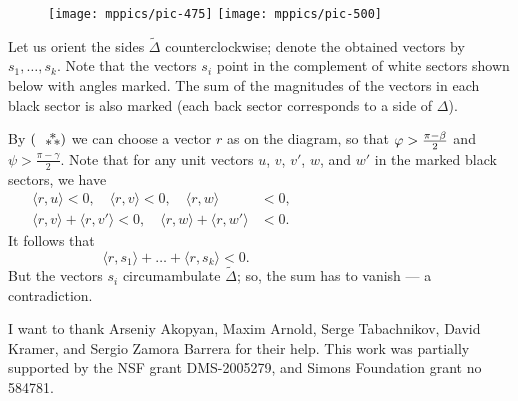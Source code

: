 \documentclass[oneside,a4paper]{amsart}
\begin{document}
\begin{figure}
\vskip-2mm
\centering
\texttt{[image: mppics/pic-475]}
\bigskip
\texttt{[image: mppics/pic-500]}
\vskip1mm
\end{figure}

Let us orient the sides $\tilde\Delta$ counterclockwise;
denote the obtained vectors by $s_1,\dots,s_k$.
Note that the vectors $s_i$ point in the complement of white sectors shown below with angles marked.
The sum of the magnitudes of the vectors in each black sector is also marked (each back sector corresponds to a side of $\Delta$).

By $(\asterism)$ we can choose a vector $r$ as on the diagram, so that $\phi\z>\tfrac{\pi-\beta}2$ and $\psi>\tfrac{\pi-\gamma}2$.
Note that for any unit vectors $u$, $v$, $v'$, $w$, and $w'$ in the marked black sectors,
we have
\[\begin{aligned}
\langle r,u\rangle<0,\quad \langle r,v\rangle<0,\quad \langle r,w\rangle&<0,
\\
\langle r,v\rangle+\langle r,v'\rangle<0,\quad \langle r,w\rangle+\langle r,w'\rangle&<0.
 \end{aligned}
\qquad\qquad\qquad\qquad\qquad\qquad\qquad\]
It follows that 
\[
\langle r,s_1\rangle+\dots+\langle r,s_k\rangle<0.\qquad\qquad\qquad\qquad\qquad\qquad
\]
But the vectors $s_i$ circumambulate $\tilde\Delta$;
so, the sum has to vanish
--- a contradiction.

{\small {}
I want to thank Arseniy Akopyan, Maxim Arnold, Serge Tabachnikov, David Kramer, and Sergio Zamora Barrera for their help.
This work was partially supported by the NSF grant DMS-2005279, and Simons Foundation grant no 584781.}



{\sloppy
\printbibliography
\fussy
}
\end{document}
